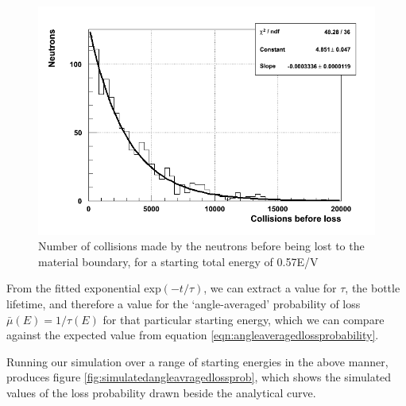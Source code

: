 \documentclass[11pt,a4paper,oneside]{article}
\begin{document}
\begin{figure}[!htbp] 	
\begin{center}
\includegraphics[scale=0.5]{figures/collisionsbeforeloss-0_57EV}
\end{center}
\caption{Number of collisions made by the neutrons before being lost to the material boundary, for a starting total energy of 0.57E/V}
\label{fig:collisionbeforeloss}
\end{figure}

From the fitted exponential exp$(-t/\tau)$, we can extract a value for $\tau$, the bottle lifetime, and therefore a value for the `angle-averaged' probability of loss $\bar{\mu}(E) = 1/\tau(E)$ for that particular starting energy, which we can compare against the expected value from equation \ref{eqn:angleaveragedlossprobability}.

Running our simulation over a range of starting energies in the above manner, produces figure \ref{fig:simulatedangleavragedlossprob}, which shows the simulated values of the loss probability drawn beside the analytical curve.
\end{document}
